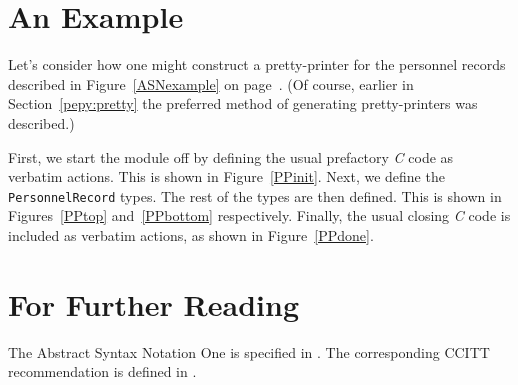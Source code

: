 \section	{An Example}
Let's consider how one might construct a pretty-printer for the personnel
records described in Figure~\ref{ASNexample} on page~\pageref{ASNexample}.
(Of course, earlier in Section~\ref{pepy:pretty} the preferred method of
generating pretty-printers was described.)

First,
we start the module off by defining the usual prefactory {\em C\/} code
as verbatim actions.
This is shown in Figure~\ref{PPinit}.
Next,
we define the \verb"PersonnelRecord" types.
The rest of the types are then defined.
This is shown in Figures~\ref{PPtop} and~\ref{PPbottom} respectively.
Finally,
the usual closing {\em C\/} code is included as verbatim actions,
as shown in Figure~\ref{PPdone}.

\clearpage
{}
\clearpage
{}\empty
{\let\small=\smaller
\clearpage
{}}
\clearpage
{}
\clearpage
{}\empty
\clearpage
{}
\clearpage
{}\empty
\clearpage

\section	{For Further Reading}\label{pepy:reading}
The Abstract Syntax Notation One is specified in \cite{ISO.PP.Syntax}.
The corresponding CCITT recommendation is defined in \cite{CCITT.PP.Syntax}.


